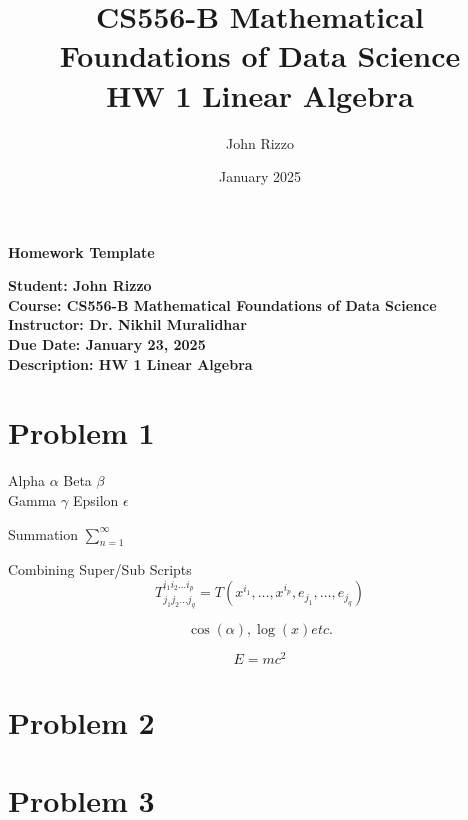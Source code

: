 \documentclass[12pt, letterpaper]{article}
\title{CS556-B Mathematical Foundations of Data Science \\ HW 1 Linear Algebra}
\author{John Rizzo}
\date{January 2025}
\newcommand{\studentname}{John Rizzo}
\newcommand{\classname}{CS556-B Mathematical Foundations of Data Science}
\newcommand{\professorname}{Dr. Nikhil Muralidhar}
\newcommand{\assignmentdescription}{HW 1 Linear Algebra}
\newcommand{\duedate}{January 23, 2025}
\begin{document}
\begin{center}
    \Large \textbf{Homework Template} \\ [10pt]
\end{center}
\vspace{0.5cm}

\noindent
\normalsize \textbf{Student: \studentname} \\ [5pt]
\textbf{Course: \classname} \\ [5pt]
\textbf{Instructor: \professorname} \\ [5pt]
\textbf{Due Date: \duedate} \\ [5pt]
\textbf{Description: \assignmentdescription}

\vspace{0.5cm}

\section*{Problem 1}

Alpha $\alpha$ Beta $\beta$ \\ Gamma $\gamma$ Epsilon $\epsilon$

Summation $\sum_{n = 1}^{\infty}$

Combining Super/Sub Scripts \[ T^{i_1 i_2 \dots i_p}_{j_1 j_2 \dots j_q} = T(x^{i_1},\dots,x^{i_p},e_{j_1},\dots,e_{j_q}) \]

\[ \cos(\alpha), \log(x) etc. \] 

\[ E=mc^2 \]

\vspace{1cm}

\section*{Problem 2}

\vspace{1cm}

\section*{Problem 3}

\vspace{1cm}

\end{document}
